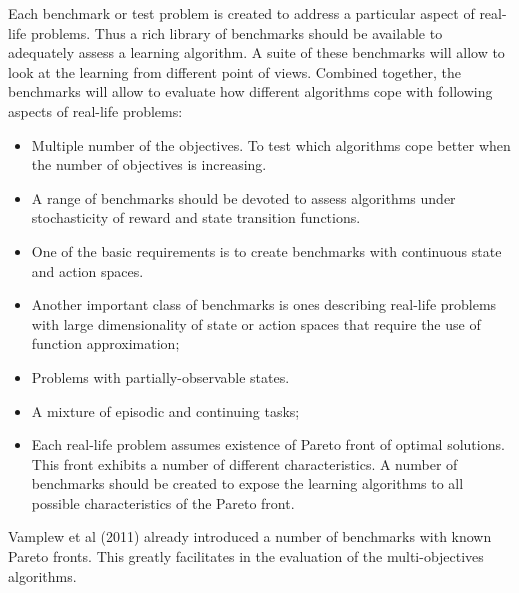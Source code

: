 {{Each benchmark or test problem is created to address a particular aspect of real-life problems. Thus a rich library of benchmarks should be available to adequately assess a learning algorithm. A suite of these benchmarks will allow to look at the learning from different point of views. Combined together, the benchmarks will allow to evaluate how different algorithms cope with following aspects of real-life problems:

\begin{itemize}

\item Multiple number of the objectives. To test which algorithms cope better when the number of objectives is increasing.

\item A range of benchmarks should be devoted to assess algorithms under stochasticity of reward and state transition functions.

\item One of the basic requirements is to create benchmarks with continuous state and action spaces.

\item Another important class of benchmarks is ones describing real-life problems with large dimensionality of state or action spaces that require the use of function approximation;

\item Problems with partially-observable states.

\item A mixture of episodic and continuing tasks;

\item Each real-life problem assumes existence of Pareto front of optimal solutions. This front exhibits a number of different characteristics. A number of benchmarks should be created to expose the learning algorithms to all possible characteristics of the Pareto front.

\end{itemize}

Vamplew et al (2011)\nocite{vamplew2011empirical} already introduced a number of benchmarks with known Pareto fronts. This greatly facilitates in the evaluation of the multi-objectives algorithms.

}}
